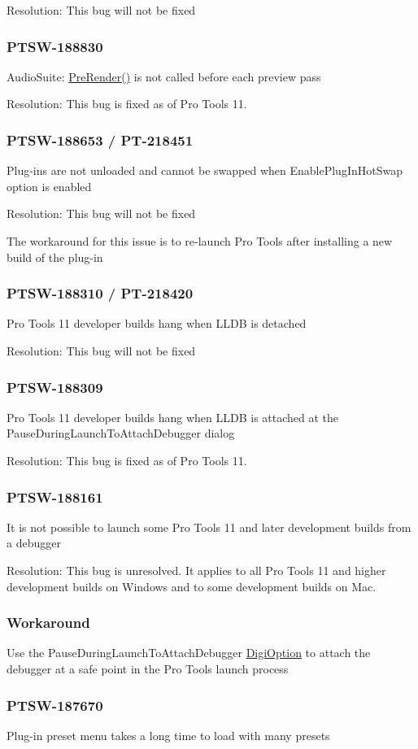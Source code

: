 Resolution\+: This bug will not be fixed\hypertarget{a00374_PTSW-188830}{}\subsubsection{P\+T\+S\+W-\/188830}\label{a00374_PTSW-188830}
Audio\+Suite\+: \hyperlink{a00066_aac48c69e51b81cc59c7b6807c1c7f9ed}{Pre\+Render()} is not called before each preview pass

Resolution\+: This bug is fixed as of Pro Tools 11.\hypertarget{a00374_PTSW-188653}{}\subsubsection{P\+T\+S\+W-\/188653 / P\+T-\/218451}\label{a00374_PTSW-188653}
Plug-\/ins are not unloaded and cannot be swapped when Enable\+Plug\+In\+Hot\+Swap option is enabled

Resolution\+: This bug will not be fixed

The workaround for this issue is to re-\/launch Pro Tools after installing a new build of the plug-\/in\hypertarget{a00374_PTSW-188310}{}\subsubsection{P\+T\+S\+W-\/188310 / P\+T-\/218420}\label{a00374_PTSW-188310}
Pro Tools 11 developer builds hang when L\+L\+D\+B is detached

Resolution\+: This bug will not be fixed\hypertarget{a00374_PTSW-188309}{}\subsubsection{P\+T\+S\+W-\/188309}\label{a00374_PTSW-188309}
Pro Tools 11 developer builds hang when L\+L\+D\+B is attached at the Pause\+During\+Launch\+To\+Attach\+Debugger dialog

Resolution\+: This bug is fixed as of Pro Tools 11.\hypertarget{a00374_PTSW-188161}{}\subsubsection{P\+T\+S\+W-\/188161}\label{a00374_PTSW-188161}
It is not possible to launch some Pro Tools 11 and later development builds from a debugger

Resolution\+: This bug is unresolved. It applies to all Pro Tools 11 and higher development builds on Windows and to some development builds on Mac.\hypertarget{a00374_Workaround}{}\subsubsection{Workaround}\label{a00374_Workaround}
Use the Pause\+During\+Launch\+To\+Attach\+Debugger \hyperlink{a00360_aax_pro_tools_guide_06c_digioptions}{Digi\+Option} to attach the debugger at a safe point in the Pro Tools launch process\hypertarget{a00374_PTSW-187670}{}\subsubsection{P\+T\+S\+W-\/187670}\label{a00374_PTSW-187670}
Plug-\/in preset menu takes a long time to load with many presets

